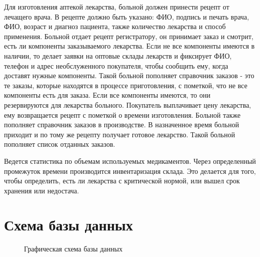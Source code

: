 \documentclass[a4paper]{article}
\begin{document}
			Для изготовления аптекой лекарства, больной должен принести рецепт от лечащего врача. В рецепте должно быть указано: ФИО, подпись и печать врача, ФИО, возраст и диагноз пациента, также количество лекарства и способ применения. Больной отдает рецепт регистратору, он принимает заказ и смотрит, есть ли компоненты заказываемого лекарства. Если не все компоненты имеются в наличии, то делает заявки на оптовые склады лекарств и фиксирует ФИО, телефон и адрес необслуженного покупателя, чтобы сообщить ему, когда доставят нужные компоненты. Такой больной пополняет справочник заказов - это те заказы, которые находятся в процессе приготовления, с пометкой, что не все компоненты есть для заказа. Если все компоненты имеются, то они резервируются для лекарства больного. Покупатель выплачивает цену лекарства, ему возвращается рецепт с пометкой о времени изготовления. Больной также пополняет справочник заказов в производстве. В назначенное время больной приходит и по тому же рецепту получает готовое лекарство. Такой больной пополняет список отданных заказов.
			
			Ведется статистика по объемам используемых медикаментов. Через определенный промежуток времени производится инвентаризация склада. Это делается для того, чтобы определить, есть ли лекарства с критической нормой, или вышел срок хранения или недостача.
			
	\newpage
	
	\section{Схема базы данных}		
		\begin{figure}[H]
			\centering
			\def\svgwidth{\columnwidth}
			
			\caption{\small Графическая схема базы данных}
		\end{figure}
			
\end{document}
